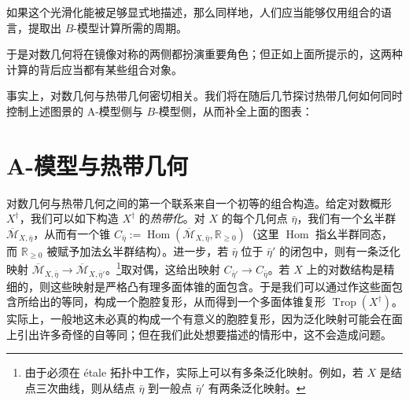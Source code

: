 如果这个光滑化能被足够显式地描述，那么同样地，人们应当能够仅用组合的语言，提取出 $B$-模型计算所需的周期。

于是对数几何将在镜像对称的两侧都扮演重要角色；但正如上面所提示的，这两种计算的背后应当都有某些组合对象。

事实上，对数几何与热带几何密切相关。我们将在随后几节探讨热带几何如何同时控制上述图景的 A-模型侧与 $B$-模型侧，从而补全上面的图表：
\begin{center}
\end{center}

\section{A-模型与热带几何}
对数几何与热带几何之间的第一个联系来自一个初等的组合构造。给定对数概形 $X^\dagger$，我们可以如下构造 $X^\dagger$ 的\emph{热带化}。对 $X$ 的每个几何点 $\bar\eta$，我们有一个幺半群 $\overline{\mathcal{M}}_{X,\bar\eta}$，从而有一个锥 $C_{\bar\eta}:=\operatorname{Hom}(\overline{\mathcal{M}}_{X,\bar\eta},\mathbb{R}_{\ge 0})$（这里 $\operatorname{Hom}$ 指幺半群同态，而 $\mathbb{R}_{\ge 0}$ 被赋予加法幺半群结构）。进一步，若 $\bar\eta$ 位于 $\bar\eta'$ 的闭包中，则有一条泛化映射 $\overline{\mathcal{M}}_{X,\bar\eta}\to\overline{\mathcal{M}}_{X,\bar\eta'}$。\footnote{由于必须在 étale 拓扑中工作，实际上可以有多条泛化映射。例如，若 $X$ 是结点三次曲线，则从结点 $\bar\eta$ 到一般点 $\bar\eta'$ 有两条泛化映射。}取对偶，这给出映射 $C_{\bar\eta'}\to C_{\bar\eta}$。若 $X$ 上的对数结构是精细的，则这些映射是严格凸有理多面体锥的面包含。于是我们可以通过作这些面包含所给出的等同，构成一个胞腔复形，从而得到一个多面体锥复形 $\operatorname{Trop}(X^\dagger)$。实际上，一般地这未必真的构成一个有意义的胞腔复形，因为泛化映射可能会在面上引出许多奇怪的自等同；但在我们此处想要描述的情形中，这不会造成问题。

